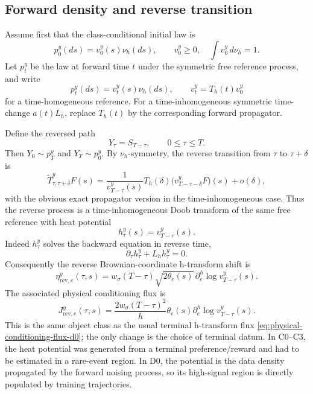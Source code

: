 \documentclass[11pt]{article}
\numberwithin{equation}{section}
\newcommand{\1}{\mathbf 1}
\begin{document}
\subsection{Forward density and reverse transition}

Assume first that the class-conditional initial law is
\[
  p_0^y(ds)=v_0^y(s)\nu_h(ds),\qquad v_0^y\ge0,\quad \int v_0^y\,d\nu_h=1.
\]
Let \(p_t^y\) be the law at forward time \(t\) under the symmetric free reference process, and write
\begin{equation}\label{eq:forward-density-d0}
  p_t^y(ds)=v_t^y(s)\nu_h(ds),
  \qquad v_t^y=T_h(t)v_0^y
\end{equation}
for a time-homogeneous reference.  For a time-inhomogeneous symmetric time-change \(a(t)L_h\), replace \(T_h(t)\) by the corresponding forward propagator.

Define the reversed path
\[
  Y_\tau=S_{T-\tau},\qquad 0\le \tau\le T.
\]
Then \(Y_0\sim p_T^y\) and \(Y_T\sim p_0^y\).  By \(\nu_h\)-symmetry, the reverse transition from \(\tau\) to \(\tau+\delta\) is
\begin{equation}\label{eq:reverse-transition-d0}
  \widetilde T^y_{\tau,\tau+\delta}F(s)
  =\frac{1}{v_{T-\tau}^y(s)}
  T_h(\delta)\bigl(v_{T-\tau-\delta}^yF\bigr)(s)+o(\delta),
\end{equation}
with the obvious exact propagator version in the time-inhomogeneous case.  Thus the reverse process is a time-inhomogeneous Doob transform of the same free reference with heat potential
\begin{equation}\label{eq:data-heat-potential-d0}
  h_\tau^y(s)=v_{T-\tau}^y(s).
\end{equation}
Indeed \(h_\tau^y\) solves the backward equation in reverse time,
\[
  \partial_\tau h_\tau^y+L_hh_\tau^y=0.
\]
Consequently the reverse Brownian-coordinate h-transform shift is
\begin{equation}\label{eq:eta-rev-d0}
  \eta_{\mathrm{rev},e}^y(\tau,s)
  =w_\sigma(T-\tau)\sqrt{2\theta_e(s)}\,\partial_e^h\log v_{T-\tau}^y(s).
\end{equation}
The associated physical conditioning flux is
\begin{equation}\label{eq:reverse-physical-flux-d0}
  J_{\mathrm{rev},e}^y(\tau,s)
  =\frac{2w_\sigma(T-\tau)^2}{h}\theta_e(s)\partial_e^h\log v_{T-\tau}^y(s).
\end{equation}
This is the same object class as the usual terminal h-transform flux \eqref{eq:physical-conditioning-flux-d0}; the only change is the choice of terminal datum.  In C0--C3, the heat potential was generated from a terminal preference/reward and had to be estimated in a rare-event region.  In D0, the potential is the data density propagated by the forward noising process, so its high-signal region is directly populated by training trajectories.
\end{document}
